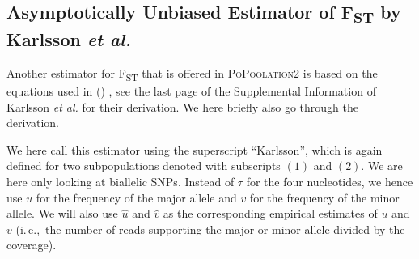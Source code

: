 \documentclass[letterpaper,fontsize=9pt,DIV=12]{scrartcl}
\newcommand\citeay[1]{\citeauthor{#1} (\citeyear{#1}) \cite{#1}}
\newcommand\toolname{\textsc}
\newcommand{\fst}{F\textsubscript{ST}}
\newcommand{\ie}{i.\,e.,~}
\begin{document}



\subsection{Asymptotically Unbiased Estimator of \texorpdfstring{\fst}{FST} by Karlsson \textit{et al.}}
\label{supp:sec:FST:sub:Karlsson}

Another estimator for \fst{} that is offered in \toolname{PoPoolation2} is based on the equations used in \citeay{Karlsson2007}, see the last page of the Supplemental Information of Karlsson \textit{et al.} for their derivation.
We here briefly also go through the derivation.

We here call this estimator using the superscript ``Karlsson'', which is again defined for two subpopulations denoted with subscripts $(1)$ and $(2)$.
We are here only looking at biallelic SNPs.
Instead of $\tau$ for the four nucleotides, we hence use $u$ for the frequency of the major allele and $v$ for the frequency of the minor allele.  We will also use $\widehat{u}$ and $\widehat{v}$ as the corresponding empirical estimates of $u$ and $v$ (\ie the number of reads supporting the major or minor allele divided by the coverage).
\end{document}
